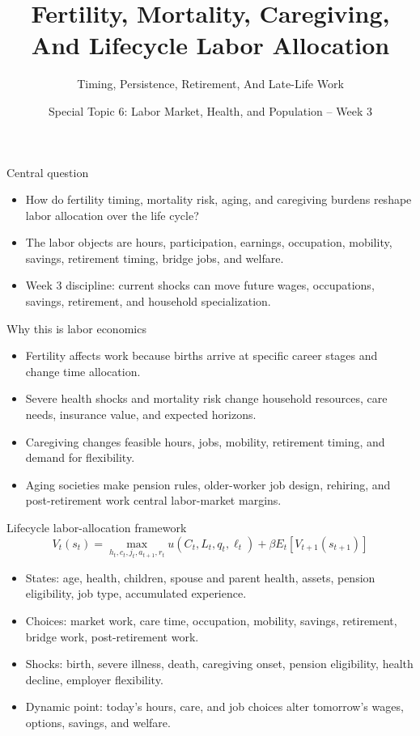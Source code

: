 \documentclass[aspectratio=169,11pt]{beamer}
\title{Fertility, Mortality, Caregiving, And Lifecycle Labor Allocation}
\subtitle{Timing, Persistence, Retirement, And Late-Life Work}
\author{Special Topic 6: Labor Market, Health, and Population -- Week 3}
\date{}
\begin{document}
\begin{frame}
  \titlepage
\end{frame}

\begin{frame}{Central question}
\begin{itemize}
    \item How do fertility timing, mortality risk, aging, and caregiving burdens reshape labor allocation over the life cycle?
    \item The labor objects are hours, participation, earnings, occupation, mobility, savings, retirement timing, bridge jobs, and welfare.
    \item Week 3 discipline: current shocks can move future wages, occupations, savings, retirement, and household specialization.
\end{itemize}
\end{frame}

\begin{frame}{Why this is labor economics}
\begin{itemize}
    \item Fertility affects work because births arrive at specific career stages and change time allocation.
    \item Severe health shocks and mortality risk change household resources, care needs, insurance value, and expected horizons.
    \item Caregiving changes feasible hours, jobs, mobility, retirement timing, and demand for flexibility.
    \item Aging societies make pension rules, older-worker job design, rehiring, and post-retirement work central labor-market margins.
\end{itemize}
\end{frame}

\begin{frame}{Lifecycle labor-allocation framework}
\small
\[
V_t(s_t) =
\max_{h_t,c_t,j_t,a_{t+1},r_t}
u(C_t,L_t,q_t,\ell_t)
+ \beta E_t[V_{t+1}(s_{t+1})]
\]
\begin{itemize}
    \item States: age, health, children, spouse and parent health, assets, pension eligibility, job type, accumulated experience.
    \item Choices: market work, care time, occupation, mobility, savings, retirement, bridge work, post-retirement work.
    \item Shocks: birth, severe illness, death, caregiving onset, pension eligibility, health decline, employer flexibility.
    \item Dynamic point: today's hours, care, and job choices alter tomorrow's wages, options, savings, and welfare.
\end{itemize}
\end{frame}
\end{document}

